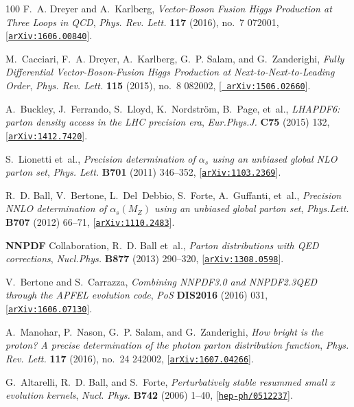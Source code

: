 \begin{thebibliography}{100}
F.~A. Dreyer and A.~Karlberg, {\it {Vector-Boson Fusion Higgs Production at
  Three Loops in QCD}},  {\em Phys. Rev. Lett.} {\bf 117} (2016), no.~7 072001,
  [\href{http://arxiv.org/abs/1606.00840}{{\tt arXiv:1606.00840}}].

M.~Cacciari, F.~A. Dreyer, A.~Karlberg, G.~P. Salam, and G.~Zanderighi, {\it
  {Fully Differential Vector-Boson-Fusion Higgs Production at
  Next-to-Next-to-Leading Order}},  {\em Phys. Rev. Lett.} {\bf 115} (2015),
  no.~8 082002, [\href{http://arxiv.org/abs/1506.02660}{{\tt
  arXiv:1506.02660}}].

A.~Buckley, J.~Ferrando, S.~Lloyd, K.~Nordström, B.~Page, et~al., {\it
  {LHAPDF6: parton density access in the LHC precision era}},  {\em
  Eur.Phys.J.} {\bf C75} (2015) 132,
  [\href{http://arxiv.org/abs/1412.7420}{{\tt arXiv:1412.7420}}].

S.~Lionetti et~al., {\it {Precision determination of $\alpha_s$ using an
  unbiased global NLO parton set}},  {\em Phys. Lett.} {\bf B701} (2011)
  346--352, [\href{http://arxiv.org/abs/1103.2369}{{\tt arXiv:1103.2369}}].

R.~D. Ball, V.~Bertone, L.~Del~Debbio, S.~Forte, A.~Guffanti, et~al., {\it
  {Precision NNLO determination of $\alpha_s(M_Z)$ using an unbiased global
  parton set}},  {\em Phys.Lett.} {\bf B707} (2012) 66--71,
  [\href{http://arxiv.org/abs/1110.2483}{{\tt arXiv:1110.2483}}].

{\bf NNPDF} Collaboration, R.~D. Ball et~al., {\it {Parton distributions with
  QED corrections}},  {\em Nucl.Phys.} {\bf B877} (2013) 290--320,
  [\href{http://arxiv.org/abs/1308.0598}{{\tt arXiv:1308.0598}}].

V.~Bertone and S.~Carrazza, {\it {Combining NNPDF3.0 and NNPDF2.3QED through
  the APFEL evolution code}},  {\em PoS} {\bf DIS2016} (2016) 031,
  [\href{http://arxiv.org/abs/1606.07130}{{\tt arXiv:1606.07130}}].

A.~Manohar, P.~Nason, G.~P. Salam, and G.~Zanderighi, {\it {How bright is the
  proton? A precise determination of the photon parton distribution function}},
   {\em Phys. Rev. Lett.} {\bf 117} (2016), no.~24 242002,
  [\href{http://arxiv.org/abs/1607.04266}{{\tt arXiv:1607.04266}}].

G.~Altarelli, R.~D. Ball, and S.~Forte, {\it {Perturbatively stable resummed
  small x evolution kernels}},  {\em Nucl. Phys.} {\bf B742} (2006) 1--40,
  [\href{http://arxiv.org/abs/hep-ph/0512237}{{\tt hep-ph/0512237}}].


\end{thebibliography}
